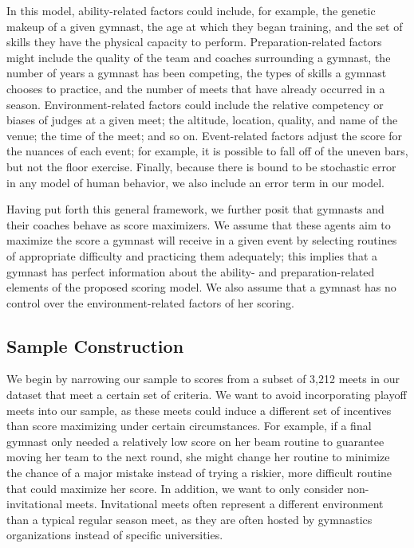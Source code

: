 \documentclass[12pt]{article}
\begin{document}
In this model, ability-related factors could include, for example, the genetic makeup of a given gymnast, the age at which they began training, and the set of skills they have the physical capacity to perform. Preparation-related factors might include the quality of the team and coaches surrounding a gymnast, the number of years a gymnast has been competing, the types of skills a gymnast chooses to practice, and the number of meets that have already occurred in a season. Environment-related factors could include the relative competency or biases of judges at a given meet; the altitude, location, quality, and name of the venue; the time of the meet; and so on. Event-related factors adjust the score for the nuances of each event; for example, it is possible to fall off of the uneven bars, but not the floor exercise. Finally, because there is bound to be stochastic error in any model of human behavior, we also include an error term in our model.

Having put forth this general framework, we further posit that gymnasts and their coaches behave as score maximizers. We assume that these agents aim to maximize the score a gymnast will receive in a given event by selecting routines of appropriate difficulty and practicing them adequately; this implies that a gymnast has perfect information about the ability- and preparation-related elements of the proposed scoring model. We also assume that a gymnast has no control over the environment-related factors of her scoring.

\subsection{Sample Construction}

We begin by narrowing our sample to scores from a subset of 3,212 meets in our dataset that meet a certain set of criteria. We want to avoid incorporating playoff meets into our sample, as these meets could induce a different set of incentives than score maximizing under certain circumstances. For example, if a final gymnast only needed a relatively low score on her beam routine to guarantee moving her team to the next round, she might change her routine to minimize the chance of a major mistake instead of trying a riskier, more difficult routine that could maximize her score. In addition, we want to only consider non-invitational meets. Invitational meets often represent a different environment than a typical regular season meet, as they are often hosted by gymnastics organizations instead of specific universities.
\end{document}
